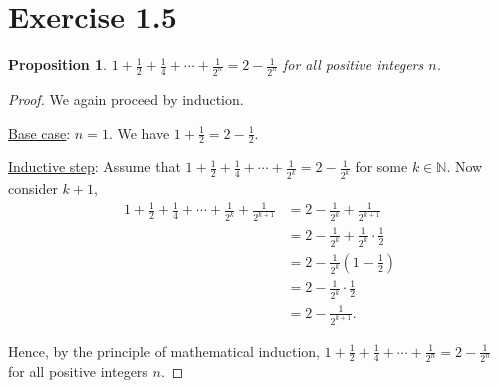 \documentclass{article}
\newtheorem{proposition}[thm]{Proposition}
\begin{document}
\section*{Exercise 1.5}
\begin{proposition}
    $1 + \frac{1}{2} + \frac{1}{4} + \cdots + \frac{1}{2^n} = 2 - \frac{1}{2^n}$ for all positive 
    integers $n$.
\end{proposition}
\begin{proof}
    We again proceed by induction.

    \underline{Base case}: $n=1$. We have $1 + \frac{1}{2} = 2 - \frac{1}{2}$.

    \underline{Inductive step}: Assume that $1 + \frac{1}{2} + \frac{1}{4} + \cdots 
    + \frac{1}{2^k} = 2 - \frac{1}{2^k}$ for some $k \in \mathbb{N}$. Now consider $k+1$,
    \begin{align*}
        1 + \frac{1}{2} + \frac{1}{4} + \cdots + \frac{1}{2^k} + \frac{1}{2^{k+1}} & = 
        2 - \frac{1}{2^k} + \frac{1}{2^{k+1}} \\
        & = 2 - \frac{1}{2^k} + \frac{1}{2^k}\cdot \frac{1}{2} \\
        & = 2 - \frac{1}{2^k}\left(1 - \frac{1}{2}\right) \\
        & = 2 - \frac{1}{2^k}\cdot \frac{1}{2} \\
        & = 2 - \frac{1}{2^{k+1}}.
    \end{align*}

    Hence, by the principle of mathematical induction, $1 + \frac{1}{2} + \frac{1}{4} + \cdots
    + \frac{1}{2^n} = 2 - \frac{1}{2^n}$ for all positive integers $n$.
\end{proof}
\end{document}
